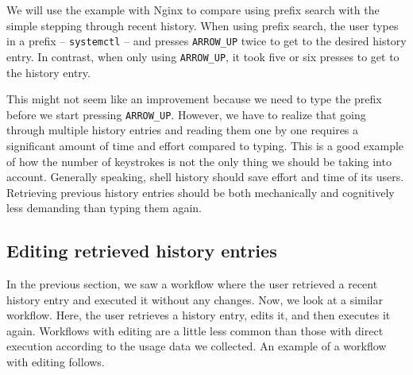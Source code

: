 We will use the example with Nginx to compare using prefix search with the simple stepping through recent history. When using prefix search, the user types in a prefix -- \verb|systemctl| -- and presses \verb|ARROW_UP| twice to get to the desired history entry. In contrast, when only using \verb|ARROW_UP|, it took five or six presses to get to the history entry.

This might not seem like an improvement because we need to type the prefix before we start pressing \verb|ARROW_UP|. However, we have to realize that going through multiple history entries and reading them one by one requires a significant amount of time and effort compared to typing. 
This is a good example of how the number of keystrokes is not the only thing we should be taking into account. Generally speaking, shell history should save effort and time of its users. Retrieving previous history entries should be both mechanically and cognitively less demanding than typing them again.\cite{greenberg1993computer}






\subsection{Editing retrieved history entries}

In the previous section, we saw a workflow where the user retrieved a recent history entry and executed it without any changes. Now, we look at a similar workflow. Here, the user retrieves a history entry, edits it, and then executes it again. Workflows with editing are a little less common than those with direct execution according to the usage data we collected. An example of a workflow with editing follows.

